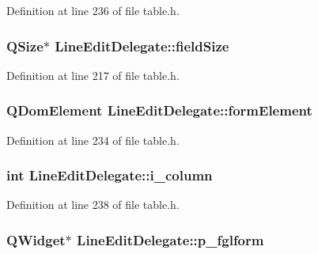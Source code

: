 Definition at line 236 of file table.h.

\hypertarget{classLineEditDelegate_ace648742ec01e245e35b39261383ae89}{
\subsubsection[{fieldSize}]{\setlength{\rightskip}{0pt plus 5cm}QSize$\ast$ {\bf LineEditDelegate::fieldSize}}}
\label{classLineEditDelegate_ace648742ec01e245e35b39261383ae89}


Definition at line 217 of file table.h.

\hypertarget{classLineEditDelegate_aa635e6dd4afb8971b6d85db420c16773}{
\subsubsection[{formElement}]{\setlength{\rightskip}{0pt plus 5cm}QDomElement {\bf LineEditDelegate::formElement}}}
\label{classLineEditDelegate_aa635e6dd4afb8971b6d85db420c16773}


Definition at line 234 of file table.h.

\hypertarget{classLineEditDelegate_a8484d34acb269d70d28e3ccaa98c8a49}{
\subsubsection[{i\_\-column}]{\setlength{\rightskip}{0pt plus 5cm}int {\bf LineEditDelegate::i\_\-column}}}
\label{classLineEditDelegate_a8484d34acb269d70d28e3ccaa98c8a49}


Definition at line 238 of file table.h.

\hypertarget{classLineEditDelegate_a2f504917f4de35dd8f400d8d696bdc1d}{
\subsubsection[{p\_\-fglform}]{\setlength{\rightskip}{0pt plus 5cm}QWidget$\ast$ {\bf LineEditDelegate::p\_\-fglform}}}
\label{classLineEditDelegate_a2f504917f4de35dd8f400d8d696bdc1d}


